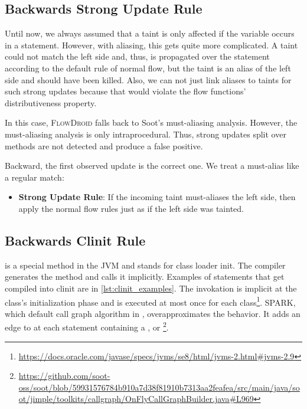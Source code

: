 \documentclass[../draft.tex]{subfiles}
\begin{document}
    \subsection{Backwards Strong Update Rule}
    Until now, we always assumed that a taint is only affected if the variable occurs in a statement. 
    However, with aliasing, this gets quite more complicated. 
    A taint could not match the left side and, thus, is propagated over the statement according to the default rule of normal flow, but the taint is an alias of the left side and should have been killed. 
    Also, we can not just link aliases to taints for such strong updates because that would violate the flow functions' distributiveness property.
    
    In this case, \textsc{FlowDroid} falls back to Soot's must-aliasing analysis. However, the must-aliasing analysis is only intraprocedural. Thus, strong updates split over methods are not detected and produce a false positive.
    
    Backward, the first observed update is the correct one. We treat a must-alias like a regular match:
    \begin{itemize}
        \item \textbf{Strong Update Rule}: If the incoming taint must-aliases the left side, then apply the normal flow rules just as if the left side was tainted. 
    \end{itemize}

    \subsection{Backwards Clinit Rule}\label{s:clinitrule}
     is a special method in the JVM and stands for class loader init. The compiler generates the method and calls it implicitly. Examples of statements that get compiled into clinit are in \autoref{lst:clinit_examples}. The invokation is implicit at the class's initialization phase and is executed at most once for each class\footnote{\url{https://docs.oracle.com/javase/specs/jvms/se8/html/jvms-2.html\#jvms-2.9}}. 
    SPARK, which default call graph algorithm in , overapproximates the  behavior. It adds an edge to  at each statement containing a ,  or 
    \footnote{\url{https://github.com/soot-oss/soot/blob/59931576784b910a7d38f81910b7313aa2feafea/src/main/java/soot/jimple/toolkits/callgraph/OnFlyCallGraphBuilder.java\#L969}}.
   
\end{document}

